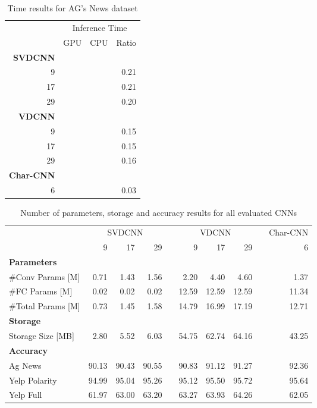 \documentclass[conference]{IEEEtran}
\newcommand{\ra}[1]{\renewcommand{\arraystretch}{#1}}
\begin{document}
\begin{table}[!b]
\caption{Time results for AG's News dataset}
\label{time_results}
\ra{1.3}
\begin{center}
\begin{tabular}{@{}rrrr@{}}\toprule
& \multicolumn{3}{c}{Inference Time} \\
\cmidrule{2-4}
& GPU & CPU & Ratio \\ \midrule
\textbf{SVDCNN}\\
9 &  &  & 0.21 \\
17 &  &  & 0.21 \\
29 &  &  & 0.20 \\
\textbf{VDCNN}\\
9 &  &  & 0.15 \\
17 &  &  & 0.15 \\
29 &  &  & 0.16 \\
\textbf{Char-CNN}\\
6 &  &  & 0.03 \\
\bottomrule
\end{tabular}
\end{center}
\end{table}

\begin{table*}[htpb]\centering
\caption{Number of parameters, storage and accuracy results for all evaluated CNNs}
\label{comparison_results}
\ra{1.3}
\begin{tabular}{@{}lrrrcrrrcr@{}}\toprule
& \multicolumn{3}{c}{SVDCNN} & \phantom{abc}& \multicolumn{3}{c}{VDCNN} &
\phantom{abc} & Char-CNN\\
\cmidrule{2-4} \cmidrule{6-8}  \cmidrule{10-10}
& 9 & 17 & 29 && 9 & 17 & 29 && 6\\ \midrule
\textbf{Parameters}\\
\#Conv Params [M] & 0.71 & 1.43 & 1.56 && 2.20 & 4.40 & 4.60 && 1.37\\
\#FC Params [M] & 0.02 & 0.02 & 0.02 && 12.59 & 12.59 & 12.59 && 11.34\\
\#Total Params [M] & 0.73 & 1.45 & 1.58 && 14.79 & 16.99 & 17.19 && 12.71\vspace{5px}
\\
\textbf{Storage}\\
Storage Size [MB] & 2.80 & 5.52 & 6.03 && 54.75 & 62.74 & 64.16 && 43.25\vspace{5px}
\\
\textbf{Accuracy}\\
Ag News & 90.13& 90.43&90.55& & 90.83& 91.12& 91.27&& 92.36\\
Yelp Polarity &94.99& 95.04& 95.26&& 95.12& 95.50& 95.72&& 95.64\\ 
Yelp Full &61.97& 63.00& 63.20&& 63.27& 63.93& 64.26&& 62.05\vspace{5px}
\\
\bottomrule
\end{tabular}
\end{table*}
\end{document}
